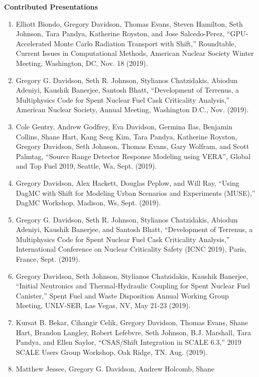 \documentclass[letterpaper,11pt]{article}
\newcommand{\leftsubheading}[1]{
  \textbf{#1\vspace{-6pt} \\}}
\begin{document}
\leftsubheading{Contributed Presentations}
\begin{enumerate}
  \item Elliott Biondo, Gregory Davidson, Thomas Evans, Steven
    Hamilton, Seth Johnson, Tara Pandya, Katherine Royston, and Jose
    Salcedo-Perez, ``GPU-Accelerated Monte Carlo Radiation Transport
    with Shift,'' Roundtable, Current Issues in Computational Methods,
    American Nuclear Society Winter Meeting, Washington, DC, Nov. 18
    (2019).
  \item Gregory G. Davidson, Seth R. Johnson, Stylianos Chatzidakis,
    Abiodun Adeniyi, Kaushik Banerjee, Santosh Bhatt, ``Development
    of Terrenus, a Multiphysics Code for Spent Nuclear Fuel Cask
    Criticality Analysis,'' American Nuclear Society, Annual
    Meeting, Washington D.C., Nov. (2019).
  \item Cole Gentry, Andrew Godfrey, Eva Davidson, Germina Ilas,
    Benjamin Collins, Shane Hart, Kang Seog Kim, Tara Pandya,
    Katherine Royston, Gregory Davidson, Seth Johnson, Thomas Evans,
    Gary Wolfram, and Scott Palmtag, ``Source Range Detector
    Response Modeling using VERA'', Global and Top Fuel 2019,
    Seattle, Wa, Sept. (2019).
  \item Gregory Davidson, Alex Hackett, Douglas Peplow, and Will
    Ray, ``Using DagMC with Shift for Modeling Urban Scenarios and
    Experiments (MUSE),'' DagMC Workshop, Madison, Ws, Sept. (2019).
  \item Gregory G. Davidson, Seth R. Johnson, Stylianos Chatzidakis,
    Abiodun Adeniyi, Kaushik Banerjee, and Santosh Bhatt,
    ``Development of Terrenus, a Multiphysics Code for Spent Nuclear
    Fuel Cask Criticality Analysis,'' International Conference on
    Nuclear Criticality Safety (ICNC 2019), Paris, France,
    Sept. (2019).
  \item Gregory Davidson, Seth Johnson, Stylianos Chatzidakis, Kaushik
    Banerjee, ``Initial Neutronics and Thermal-Hydraulic Coupling for
    Spent Nuclear Fuel Canister,'' Spent Fuel and Waste Disposition
    Annual Working Group Meeting, UNLV-SEB, Las Vegas, NV, May 21-23
    (2019). 
  \item Kursat B. Bekar, Cihangir Celik, Gregory Davidson, Thomas
    Evans, Shane Hart, Brandon Langley, Robert Lefebvre, Seth
    Johnson, B.J. Marshall, Tara Pandya, and Ellen Saylor,
    ``CSAS/Shift Integration in SCALE 6.3,'' 2019 SCALE Users Group
    Workshop, Oak Ridge, TN. Aug. (2019).
  \item Matthew Jessee, Gregory G. Davidson, Andrew Holcomb, Shane

\end{enumerate}
\end{document}
